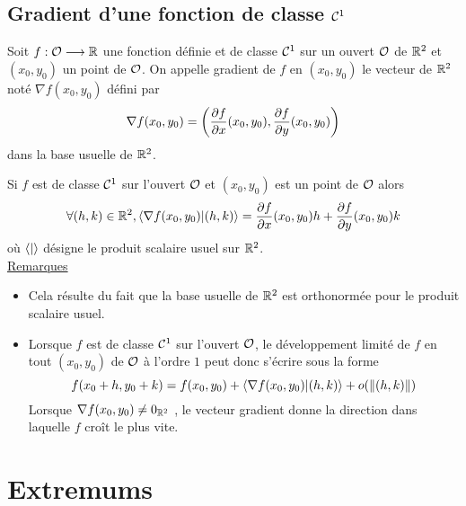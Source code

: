 \subsection{Gradient d’une fonction de classe \(\cal{C}^{1}\)}
\begin{defprop}
    Soit \(f : \cal{O} \to  \R\) une fonction définie et de classe \(\cal{C}^{1}\) sur un ouvert \(\cal{O}\) de \(\R^2\) et \((x_0, y_0)\) un point de \(\cal{O}\).
    On appelle gradient de \(f\) en \((x_0, y_0)\) le vecteur de \(\R^2\) noté \(\nabla f (x_0, y_0)\) défini par
    \[\nabla f (x_0, y_0) = \paren{\frac{\partial f}{\partial x} (x_0, y_0), \frac{\partial f}{\partial y} (x_0, y_0)}\]
    dans la base usuelle de \(\R^2\).
\end{defprop}
\begin{prop}
    Si \(f\) est de classe \(\cal{C}^{1}\) sur l’ouvert \(\cal{O}\) et \((x_0, y_0)\) est un point de \(\cal{O}\) alors
    \[\forall (h, k) \in \R^2, \scal{ \nabla f (x_0, y_0)}{ (h, k) } = \frac{\partial f}{\partial x} (x_0, y_0) h + \frac{\partial f}{\partial y} (x_0, y_0) k\]
    où \(\scal{}{}\) désigne le produit scalaire usuel sur \(\R^2\).\\
    \underline{Remarques}\\
    \begin{itemize}
        \item Cela résulte du fait que la base usuelle de \(\R^2\) est orthonormée pour le produit scalaire usuel.
        \item  Lorsque \(f\) est de classe \(\cal{C}^{1}\) sur l’ouvert \(\cal{O}\), le développement limité de \(f\) en tout \((x_0, y_0)\) de \(\cal{O}\) à l’ordre \(1\) peut donc s’écrire sous la forme
        \[f (x_0 + h, y_0 + k) = f (x_0, y_0) + \scal{ \nabla f (x_0, y_0)}{ (h, k) } + o(\norme{(h, k)})\]
        Lorsque \(\nabla f (x_0, y_0)\neq 0_{\R^2}\) , le vecteur gradient donne la direction dans laquelle \(f\) croît le plus vite.
    \end{itemize}
\end{prop}
\section{Extremums}
